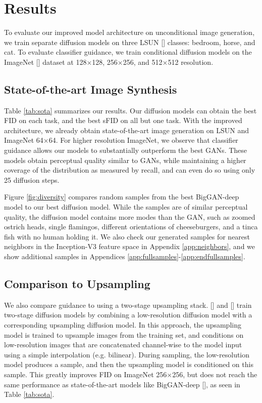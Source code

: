 \section{Results}
\label{sec:results}
To evaluate our improved model architecture on unconditional image generation, we train separate diffusion models on three LSUN [] classes: bedroom, horse, and cat. To evaluate classifier guidance, we train conditional diffusion models on the ImageNet [] dataset at 128$\times$128, 256$\times$256, and 512$\times$512 resolution.

\subsection{State-of-the-art Image Synthesis}

Table \ref{tab:sota} summarizes our results. Our diffusion models can obtain the best FID on each task, and the best sFID on all but one task. With the improved architecture, we already obtain state-of-the-art image generation on LSUN and ImageNet 64$\times$64. For higher resolution ImageNet, we observe that classifier guidance allows our models to substantially outperform the best GANs. These models obtain perceptual quality similar to GANs, while maintaining a higher coverage of the distribution as measured by recall, and can even do so using only 25 diffusion steps.

Figure \ref{fig:diversity} compares random samples from the best BigGAN-deep model to our best diffusion model. While the samples are of similar perceptual quality, the diffusion model contains more modes than the GAN, such as zoomed ostrich heads, single flamingos, different orientations of cheeseburgers, and a tinca fish with no human holding it. We also check our generated samples for nearest neighbors in the Inception-V3 feature space in Appendix \ref{app:neighbors}, and we show additional samples in Appendices \ref{app:fullsamples}-\ref{app:endfullsamples}.

\subsection{Comparison to Upsampling}

We also compare guidance to using a two-stage upsampling stack. \citeauthor{improved} [] and \citeauthor{sr3} [] train two-stage diffusion models by combining a low-resolution diffusion model with a corresponding upsampling diffusion model. In this approach, the upsampling model is trained to upsample images from the training set, and conditions on low-resolution images that are concatenated channel-wise to the model input using a simple interpolation (e.g. bilinear). During sampling, the low-resolution model produces a sample, and then the upsampling model is conditioned on this sample. This greatly improves FID on ImageNet 256$\times$256, but does not reach the same performance as state-of-the-art models like BigGAN-deep [], as seen in Table \ref{tab:sota}. 

